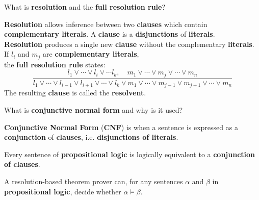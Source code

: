 \begin{flashcard}[Question]{What is \textbf{resolution} and the \textbf{full resolution rule}?}
\begin{center}
\textbf{Resolution} allows inference between two \textbf{clauses} which contain \textbf{complementary literals}. A \textbf{clause} is a \textbf{disjunctions} of \textbf{literals}.\\\textbf{Resolution} produces a single new \textbf{clause} without the complementary \textbf{literals}. If $l_i$ and $m_j$ are \textbf{complementary literals},\\the \textbf{full resolution rule} states:
\begin{displaymath}
\frac{l_1 \lor \cdots \lor l_i \lor \cdots l_k, \quad m_1 \lor \cdots \lor m_j \lor \cdots \lor m_n}
{l_1 \lor \cdots \lor l_{i-1} \lor l_{i+1} \lor \cdots \lor l_k \lor m_1 \lor \cdots \lor m_{j-1} \lor m_{j+1} \lor \cdots \lor m_n}
\end{displaymath}
The resulting \textbf{clause} is called the \textbf{resolvent}.
\end{center}
\end{flashcard}

\begin{flashcard}[Question]{What is \textbf{conjunctive normal form} and why is it used?}
\begin{center}
\textbf{Conjunctive Normal Form} (\textbf{CNF}) is when a sentence is expressed as a \textbf{conjunction} of \textbf{clauses}, i.e. \textbf{disjunctions of literals}.

\medskip

Every sentence of \textbf{propositional logic} is logically equivalent to a \textbf{conjunction of clauses}.

\medskip

A resolution-based theorem prover can, for any sentences $\alpha$ and $\beta$ in \textbf{propositional logic}, decide whether $\alpha \models \beta$.
\end{center}
\end{flashcard}
